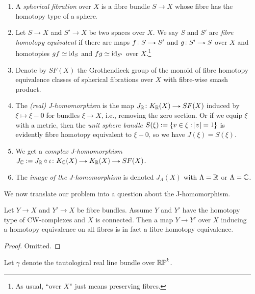 \begin{definitions}
  \label{J-dfns}
  \begin{enumerate}[leftmargin=*]
  \item A \emph{spherical fibration} over $X$ is a fibre bundle $S \to
    X$ whose fibre has the homotopy type of a sphere.
  \item Let $S \to X$ and $S' \to X$ be two spaces over $X$. We say
    $S$ and $S'$ are \emph{fibre homotopy equivalent} if there are
    maps $f \c S \to S'$ and $g \c S' \to S$ over $X$ and homotopies
    $gf \simeq \mathrm{id}_S$ and $fg \simeq \mathrm{id}_{S'}$ over $X$.\footnote{As
      usual, ``over $X$'' just means preserving fibres.}
  \item Denote by $SF(X)$ the Grothendieck group of the monoid of
    fibre homotopy equivalence classes of spherical fibrations over
    $X$ with fibre-wise smash product.
  \item The \emph{(real) J-homomorphism} is the map $J_\R \c K_\R(X)
    \to SF(X)$ induced by $\xi \mapsto \xi-0$ for bundles $\xi \to
    X$, i.e., removing the zero section. Or if we equip $\xi$ with a
    metric, then the \emph{unit sphere bundle} $S(\xi) \mathrel{:=} \{v \in \xi
    : |v| = 1\}$ is evidently fibre homotopy equivalent to $\xi-0$, so
    we have $J(\xi) = S(\xi)$.
  \item We get a \emph{complex J-homomorphism} $J_\C \ce J_\R \circ
    \iota \c K_\C(X) \to K_\R(X) \to SF(X)$.
  \item The \emph{image of the J-homomorphism} is denoted
    $J_\Lambda(X)$ with $\Lambda = \mathbb{R}$ or $\Lambda = \mathbb{C}$.
  \end{enumerate}
\end{definitions}

We now translate our problem into a question about the J-homomorphism.

\begin{lemma}
  \label{dold-fibre}
  Let $Y \to X$ and $Y' \to X$ be fibre bundles. Assume $Y$ and $Y'$
  have the homotopy type of CW-complexes and $X$ is connected. Then a
  map $Y \to Y'$ over $X$ inducing a homotopy equivalence on all
  fibres is in fact a fibre homotopy equivalence.
\end{lemma}

\begin{proof}
  Omitted.
\end{proof}

\begin{notation}
  \label{bundle-notation}
  Let $\gamma$ denote the tautological real line bundle over $\mathbb{RP}^k$.
\end{notation}

